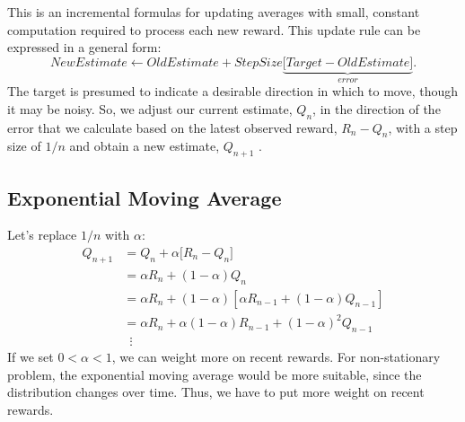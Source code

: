This is an incremental formulas for updating averages with small, constant computation required to process each new reward. This update rule can be expressed in a general form:
$$NewEstimate \leftarrow OldEstimate + StepSize \underbrace{\Big[Target - OldEstimate \Big]}_{error}.$$
The target is presumed to indicate a desirable direction in which to move, though it may be noisy. So, we adjust our current estimate, $Q_n$, in the direction of the error that we calculate based on the latest observed reward, $R_n-Q_n$, with a step size of $1/n$   and obtain  a new estimate, $Q_{n+1}$ . 


\subsection{Exponential Moving Average}

Let's replace $1/n$ with $\alpha$:
\begin{align*}
	Q_{n+1} &=  Q_n + \alpha \Big[R_n - Q_n \Big]\\
			&= \alpha R_n + (1-\alpha)Q_n\\
			&= \alpha R_n + (1-\alpha)[\alpha R_{n-1} + (1-\alpha)Q_{n-1}]\\
			&= \alpha R_n + \alpha(1-\alpha)R_{n-1} + (1-\alpha)^2Q_{n-1}\\
			&\,\,\, \vdots
\end{align*}
If we set $0<\alpha<1$, we can weight more on recent rewards. For non-stationary problem, the exponential moving average would be more suitable, since the distribution changes over time. Thus, we have to put more weight on recent rewards. 






